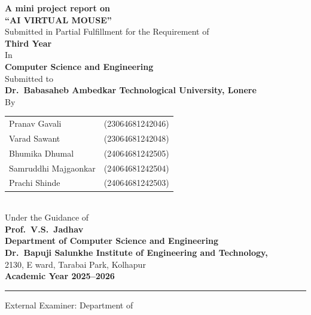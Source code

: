 \documentclass[12pt,a4paper]{report}
\begin{document}
\begin{titlepage}
  \centering
  \vspace*{1cm}

  {\Large\bfseries A mini project report on}\\[0.4cm]
  {\LARGE\bfseries ``AI VIRTUAL MOUSE''}\\[0.6cm]

  {\normalsize Submitted in Partial Fulfillment for the Requirement of}\\[0.2cm]
  {\large\bfseries Third Year}\\[0.1cm]
  {\normalsize In}\\[0.1cm]
  {\large\bfseries Computer Science and Engineering}\\[0.6cm]

  {\normalsize Submitted to}\\[0.4cm]
  {\large\bfseries Dr.\ Babasaheb Ambedkar Technological University, Lonere}\\[0.6cm]

  {\normalsize By}\\[0.4cm]
  \begin{tabular}{ll}
    Pranav Gavali       & (23064681242046) \\
    Varad Sawant        & (23064681242048) \\
    Bhumika Dhumal      & (24064681242505) \\
    Samruddhi Majgaonkar & (24064681242504) \\
    Prachi Shinde       & (24064681242503) \\
  \end{tabular}\\[0.6cm]

  {\normalsize Under the Guidance of}\\[0.2cm]
  {\large\bfseries Prof.\ V.S.\ Jadhav}\\[0.8cm]

  {\large\bfseries Department of Computer Science and Engineering}\\[0.2cm]
  {\large\bfseries Dr.\ Bapuji Salunkhe Institute of Engineering and Technology,}\\
  {\normalsize 2130, E ward, Tarabai Park, Kolhapur}\\[0.4cm]
  {\large\bfseries Academic Year 2025--2026}

  \vfill
  \hrule\vspace{0.3cm}
  {\small External Examiner: \underline{\hspace{4cm}} \hfill Department of \underline{\hspace{4cm}}}
\end{titlepage}
\end{document}
